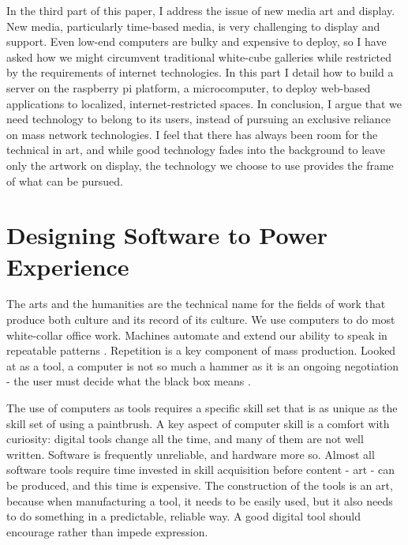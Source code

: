 In the third part of this paper, I address the issue of new media art and display. New media, particularly time-based media, is very challenging to display and support. Even low-end computers are bulky and expensive to deploy, so I have asked how we might circumvent traditional white-cube galleries while restricted by the requirements of internet technologies. In this part I detail how to build a server on the raspberry pi platform, a microcomputer, to deploy web-based applications to localized, internet-restricted spaces.
In conclusion, I argue that we need technology to belong to its users, instead of pursuing an exclusive reliance on mass network technologies. I feel that there has always been room for the technical in art, and while good technology fades into the background to leave only the artwork on display, the technology we choose to use provides the frame of what can be pursued.

\section{Designing Software to Power Experience}
The arts and the humanities are the technical name for the fields of work that produce both culture and its record of its culture. We use computers to do most white-collar office work. Machines automate and extend our ability to speak in repeatable patterns \parencite{glanville}. Repetition is a key component of mass production. Looked at as a tool, a computer is not so much a hammer as it is an ongoing negotiation - the user must decide what the black box means \parencite{glanville}.

The use of computers as tools requires a specific skill set that is as unique as the skill set of using a paintbrush. A key aspect of computer skill is a comfort with curiosity: digital tools change all the time, and many of them are not well written. Software is frequently unreliable, and hardware more so. Almost all software tools require time invested in skill acquisition before content - art - can be produced, and this time is expensive. The construction of the tools is an art, because when manufacturing a tool, it needs to be easily used, but it also needs to do something in a predictable, reliable way. A good digital tool should encourage rather than impede expression.

